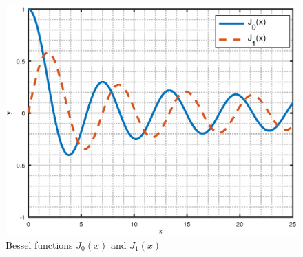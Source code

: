 \begin{figure}[ht]
\centering
\includegraphics[scale=0.52]{bessel}\vspace{-2mm}
\caption[]{\enskip Bessel functions $J_0(x)$ and $J_1(x)$}
\label{fig:bessel}
\end{figure}
\newpage
\startexercises\label{sec9dot4}
